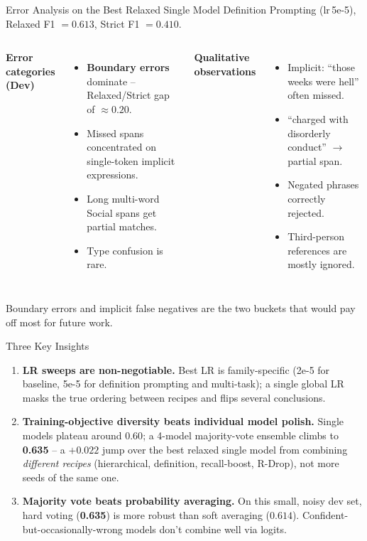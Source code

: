 \documentclass[aspectratio=169,10pt]{beamer}
\newcommand{\ours}{\textcolor{good}{\textbf{0.635}}}
\begin{document}
\begin{frame}{Error Analysis on the Best Relaxed Single Model}
  Definition Prompting (lr\,5e-5), Relaxed F1 $= 0.613$, Strict F1 $= 0.410$.
  \medskip
  \begin{columns}[T,onlytextwidth]
      \textbf{Error categories (Dev)}
      \begin{itemize}
        \item \textbf{Boundary errors} dominate -- Relaxed/Strict gap of $\approx 0.20$.
        \item Missed spans concentrated on single-token implicit expressions.
        \item Long multi-word Social spans get partial matches.
        \item Type confusion is rare.
      \end{itemize}
      \textbf{Qualitative observations}
      \begin{itemize}
        \item Implicit: ``those weeks were hell'' often missed.
        \item ``charged with disorderly conduct'' $\to$ partial span.
        \item Negated phrases correctly rejected.
        \item Third-person references are mostly ignored.
      \end{itemize}
  \end{columns}
  \vfill
  \textcolor{neutral}{\footnotesize Boundary errors and implicit false negatives are the two buckets that would pay off most for future work.}
\end{frame}

\begin{frame}{Three Key Insights}
  \begin{enumerate}
    \item \textbf{LR sweeps are non-negotiable.}
          Best LR is family-specific (2e-5 for baseline, 5e-5 for definition prompting and multi-task);
          a single global LR masks the true ordering between recipes and flips several conclusions.
    \smallskip
    \item \textbf{Training-objective diversity beats individual model polish.}
          Single models plateau around $0.60$; a 4-model majority-vote ensemble
          climbs to \ours{} -- a $+0.022$ jump over the best relaxed single model from combining \emph{different recipes}
          (hierarchical, definition, recall-boost, R-Drop), not more seeds of the same one.
    \smallskip
    \item \textbf{Majority vote beats probability averaging.}
          On this small, noisy dev set, hard voting (\ours{}) is more robust
          than soft averaging ($0.614$). Confident-but-occasionally-wrong
          models don't combine well via logits.
  \end{enumerate}
\end{frame}
\end{document}
